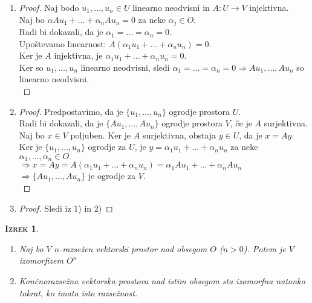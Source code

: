 \documentclass[a4paper,12pt]{article}
\newtheorem*{izrek}{\textsc{Izrek}}
\begin{document}
\begin{enumerate}
\item[1)] \begin{proof}
Naj bodo $u_1,\ldots,u_n\in U$ linearno neodvisni in $A:U\to V$ injektivna. \\

Naj bo $\alpha A u_1+\ldots+\alpha_n Au_n=0$ za neke $\alpha_j\in O$. \\

Radi bi dokazali, da je $\alpha_1=\ldots=\alpha_n=0$. \\

Upoštevamo linearnost: $A(\alpha_1u_1+\ldots+\alpha_nu_n)=0$. \\

Ker je $A$ injektivna, je $\alpha_1u_1+\ldots+\alpha_nu_n=0$. \\

Ker so $u_1,\ldots,u_n$ linearno neodvisni, sledi $\alpha_1=\ldots=\alpha_n=0\Rightarrow Au_1,\ldots,Au_n$ so linearno neodvisni.\\
\end{proof}

\item[2)] \begin{proof}
Predpostavimo, da je $\{u_1,\ldots,u_n\}$ ogrodje prostora $U$. \\

Radi bi dokazali, da je $\{Au_1,\ldots,Au_n\}$ ogrodje prostora $V$, če je $A$ surjektivna. \\

Naj bo $x\in V$ poljuben. Ker je $A$ surjektivna, obstaja $y\in U$, da je $x=Ay$. \\

Ker je $\{u_1,\ldots,u_n\}$ ogrodje za $U$, je $y=\alpha_1u_1+\ldots+\alpha_nu_n$ za neke $\alpha_1,\ldots,\alpha_n\in O$ \\

$\Rightarrow x=Ay=A(\alpha_1u_1+\ldots+\alpha_nu_n)=\alpha_1Au_1+\ldots+\alpha_nAu_n$ \\

$\Rightarrow \{Au_1,\ldots,Au_n\}$ je ogrodje za $V$.\\
\end{proof}


\item[3)] \begin{proof} Sledi iz 1) in 2) \end{proof}

\end{enumerate}
\newpage
\begin{izrek} ~

\begin{enumerate}
\item[(1)] Naj bo $V$ $n$-razsežen vektorski prostor nad obsegom $O$ ($n>0$). Potem je $V$ izomorfizem $O^n$
\item[(2)] Končnorazsežna vektorska prostora nad istim obsegom sta izomorfna natanko takrat, ko imata isto razsežnost.\\
\end{enumerate}
\end{izrek}
\end{document}
